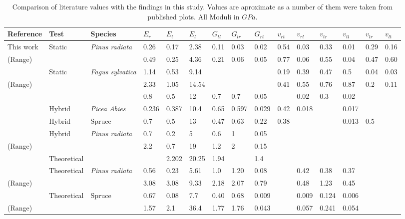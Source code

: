 \documentclass[10pt]{article}
\begin{document}
\begin{landscape}
\begin{table}
\scriptsize
\caption[Comparison with values from the literature]{Comparison of literature values with the findings in this study. Values are aproximate as a number of them were taken from published plots. All Moduli in \(GPa\).}
\label{table:lit_comp}
\begin{tabular}{lllllllllllllll}
\hline
Reference & Test & Species& \(E_r\) & \(E_t\) & \(E_l\) & \(G_{tl}\) & \(G_{lr}\) & \(G_{rt}\) & \(v_{rt}\) &\(v_{rl}\)  & \(v_{tr}\)   & \(v_{tl}\)&\(v_{lr}\)&\(v_{lt}\)\\
\hline
This work & Static & \textit{Pinus radiata}& 0.26  & 0.17 & 2.38 & 0.11 & 0.03 & 0.02 & 0.54 & 0.03 & 0.33 & 0.01 & 0.29 &0.16\\
(Range)& && 0.49 & 0.25 & 4.36 & 0.21 & 0.06 & 0.05 &  0.77 & 0.06 & 0.55 & 0.04 & 0.47 & 0.60\\
\cite{ozyhar_moisture-dependent_2013}& Static & \textit{Fagus sylvatica} &1.14  & 0.53 & 9.14 &  &  &  & 0.19  & 0.39 & 0.47 & 0.5 & 0.04 & 0.03\\
(Range)&  &  &2.33  & 1.05 & 14.54 &  &  &  & 0.41  & 0.55 & 0.76 & 0.87 & 0.2 & 0.11\\
\cite{henrik_three_2013}& &  & 0.8 & 0.5 & 12 & 0.7 & 0.7 & 0.05 &   & 0.02 & 0.3 & 0.02 && \\
\cite{raffaele_morphology_2011}& Hybrid &\textit{Picea Abies} & 0.236 & 0.387 & 10.4 & 0.65 & 0.597 & 0.029 & 0.42  & 0.018 &  &0.017  &  & \\
\cite{mackenzie-helnwein_rate-independent_2005}& Hybrid & Spruce & 0.7 & 0.5 & 13 & 0.47 & 0.63 & 0.22 & 0.38  &  &  & 0.013 & 0.5 & \\
\cite{ormarsson_moisture-related_2005}& Hybrid & \textit{Pinus radiata} & 0.7 & 0.2 & 5 & 0.6 & 1 & 0.05 &   &  &  &  &  & \\
(Range)&   & & 2.2 & 0.7 & 19 & 1.2 & 2 & 0.15 &   &  &  &  &  & \\
\cite{qing_3d_2009}& Theoretical& &  & 2.202 & 20.25 & 1.94 &  & 1.4 &   &  &  &  &  & \\
\cite{harrington_hierarchical_2002}& Theoretical & \textit{Pinus radiata} & 0.56 & 0.23 & 5.61 & 1.0 & 1.20 & 0.08 &   & 0.42 & 0.38 & 0.37 &  & \\
(Range)&& &3.08 & 3.08 & 9.33 & 2.18 & 2.07 & 0.79 &  & 0.48  & 1.23 & 0.45 &  &   \\
\cite{persson_micromechanical_2000}& Theoretical& Spruce &0.67  & 0.08 & 7.7 & 0.40 &0.68  & 0.009 &   & 0.009 & 0.124 & 0.006 &  & \\
(Range)& & & 1.57 & 2.1 &36.4 &1.77  & 1.76 & 0.043 &   & 0.057 & 0.241 & 0.054 &  & \\
\hline
\end{tabular}
\end{table}
\end{landscape}
\end{document}
